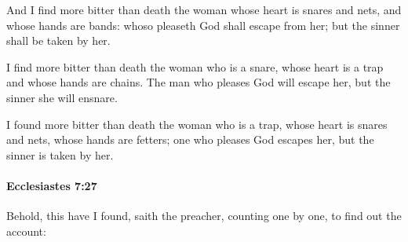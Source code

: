 			\begin{versebox}
					\item[BHS] 
					\item[LXX] 
					\item[ASV] And I find more bitter than death the woman whose heart is snares and nets, and whose hands are bands: whoso pleaseth God shall escape from her; but the sinner shall be taken by her.
					\item[NIV] I find more bitter than death the woman who is a snare, whose heart is a trap and whose hands are chains. The man who pleases God will escape her, but the sinner she will ensnare.
					\item[NRSV] I found more bitter than death the woman who is a trap, whose heart is snares and nets, whose hands are fetters; one who pleases God escapes her, but the sinner is taken by her.
			\end{versebox}

		\paragraph{Ecclesiastes 7:27} %
			\label{ECCLESIASTES-7-27}

			Behold, this have I found, saith the preacher, counting one by one, to find out the account:

